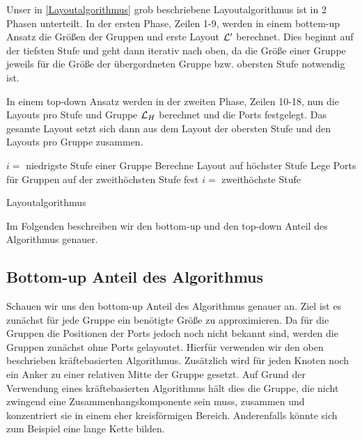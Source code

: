 Unser in \autoref{Layoutalgorithmus} grob beschriebene Layoutalgorithmus ist in 2 Phasen unterteilt. 
In der ersten Phase, Zeilen 1-9, werden in einem bottem-up Ansatz die Größen der Gruppen und erste Layout $\mathcal{L}'$ berechnet. 
Dies beginnt auf der tiefsten Stufe und geht dann iterativ nach oben, da die Größe einer Gruppe jeweils für die Größe der übergordneten Gruppe bzw. obersten Stufe notwendig ist.

In einem top-down Ansatz werden in der zweiten Phase, Zeilen 10-18, nun die Layouts pro Stufe und Gruppe $\mathcal{L}_H$ berechnet und die Ports festgelegt. 
Das gesamte Layout setzt \pagebreak[4]
sich dann aus dem Layout der obersten Stufe und den Layouts pro Gruppe zusammen.

\begin{algorithm}[H]
\label{Layoutalgorithmus}
\SetAlgoLined
{} %
$i =$ niedrigste Stufe einer Gruppe\;
Berechne Layout auf höchster Stufe\;
Lege Ports für Gruppen auf der zweithöchsten Stufe fest\;
$i =$ zweithöchste Stufe\; 
\caption{Layoutalgorithmus}
\end{algorithm}

Im Folgenden beschreiben wir den bottom-up und den top-down Anteil des Algorithmus genauer. 

\subsection{Bottom-up Anteil des Algorithmus}
Schauen wir uns den bottom-up Anteil des Algorithmus genauer an. Ziel ist es zunächst für jede Gruppe ein benötigte Größe zu approximieren.
Da für die Gruppen die Positionen der Ports jedoch noch nicht bekannt sind, werden die Gruppen zunächst ohne Ports gelayoutet.
Hierfür verwenden wir den oben beschrieben kräftebasierten Algorithmus. 
Zusätzlich wird  für jeden Knoten noch ein Anker zu einer relativen Mitte der Gruppe gesetzt. 
Auf Grund der Verwendung eines kräftebasierten Algorithmus hält dies die Gruppe, die nicht zwingend eine Zusammenhangskomponente sein muss, zusammen 
und konzentriert sie in einem eher kreisförmigen Bereich. Anderenfalls könnte sich zum Beispiel eine lange Kette bilden.

